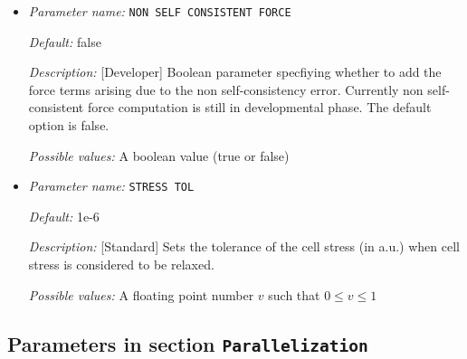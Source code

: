 \begin{itemize}
{\it Default:} 


{\it Description:} [Standard] File specifying the atomic position update permission flags. 1- update 0- no update. File format (example for two atoms with atom 1 fixed and atom 2 free): 0 0 0 (row1), 1 1 1 (row2).


{\it Possible values:} Any string
\item {\it Parameter name:} {\tt NON SELF CONSISTENT FORCE}
\label{parameters:Geometry/Optimization/NON SELF CONSISTENT FORCE}
\label{parameters:Geometry/Optimization/NON_20SELF_20CONSISTENT_20FORCE}




{\it Default:} false


{\it Description:} [Developer] Boolean parameter specfiying whether to add the force terms arising due to the non self-consistency error. Currently non self-consistent force computation is still in developmental phase. The default option is false.


{\it Possible values:} A boolean value (true or false)
\item {\it Parameter name:} {\tt STRESS TOL}
\label{parameters:Geometry/Optimization/STRESS TOL}
\label{parameters:Geometry/Optimization/STRESS_20TOL}




{\it Default:} 1e-6


{\it Description:} [Standard] Sets the tolerance of the cell stress (in a.u.) when cell stress is considered to be relaxed.


{\it Possible values:} A floating point number $v$ such that $0 \leq v \leq 1$
\end{itemize}

\subsection{Parameters in section \tt Parallelization}
\label{parameters:Parallelization}

